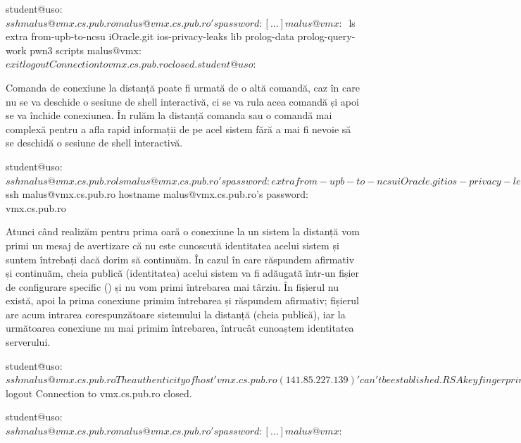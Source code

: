 \begin{screen}[caption={Acces shell la distanță folosind SSH},label={lst:sec:ssh-shell}]
student@uso:~$ ssh malus@vmx.cs.pub.ro
malus@vmx.cs.pub.ro's password:
[...]
malus@vmx:~$ ls
extra  from-upb-to-ncsu  iOracle.git  ios-privacy-leaks  lib  prolog-data  prolog-query-work  pwn3  scripts
malus@vmx:~$ exit
logout
Connection to vmx.cs.pub.ro closed.
student@uso:~$
\end{screen}

Comanda de conexiune la distanță poate fi urmată de o altă comandă, caz în care nu se va deschide o sesiune de shell interactivă, ci se va rula acea comandă și apoi se va închide conexiunea. În  rulăm la distanță comanda  sau o comandă mai complexă pentru a afla rapid informații de pe acel sistem fără a mai fi nevoie să se deschidă o sesiune de shell interactivă.

\begin{screen}[caption={Rulare comenzi la distanță prin SSH},label={lst:sec:ssh-commands}]
student@uso:~$ ssh malus@vmx.cs.pub.ro ls
malus@vmx.cs.pub.ro's password:
extra
from-upb-to-ncsu
iOracle.git
ios-privacy-leaks
lib
prolog-data
prolog-query-work
pwn3
scripts
student@uso:~$ ssh malus@vmx.cs.pub.ro hostname
malus@vmx.cs.pub.ro's password:
vmx.cs.pub.ro
\end{screen}

Atunci când realizăm pentru prima oară o conexiune la un sistem la distanță vom primi un mesaj de avertizare că nu este cunoscută identitatea acelui sistem și suntem întrebați dacă dorim să continuăm. În cazul în care răspundem afirmativ și continuăm, cheia publică (identitatea) acelui sistem va fi adăugată într-un fișier de configurare specific () și nu vom primi întrebarea mai târziu. În  fișierul  nu există, apoi la prima conexiune primim întrebarea și răspundem afirmativ; fișierul  are acum intrarea corespunzătoare sistemului la distanță (cheia publică), iar la următoarea conexiune nu mai primim întrebarea, întrucât cunoaștem identitatea serverului.

\begin{screen}[caption={Verificarea identității serverului prin SSH},label={lst:sec:ssh-host-check}]
student@uso:~$ ssh malus@vmx.cs.pub.ro
The authenticity of host 'vmx.cs.pub.ro (141.85.227.139)' can't be established.
RSA key fingerprint is SHA256:CrRMD7nrflw7/KEZ4z7lksvEd8tXxkjuVXoBqsG5Vdc.
Are you sure you want to continue connecting (yes/no)? yes
Warning: Permanently added 'vmx.cs.pub.ro,141.85.227.139' (RSA) to the list of known hosts.
malus@vmx.cs.pub.ro's password:
[...]
malus@vmx:~$ logout
Connection to vmx.cs.pub.ro closed.

student@uso:~$ ssh malus@vmx.cs.pub.ro
malus@vmx.cs.pub.ro's password:
[...]
malus@vmx:~$
\end{screen}

